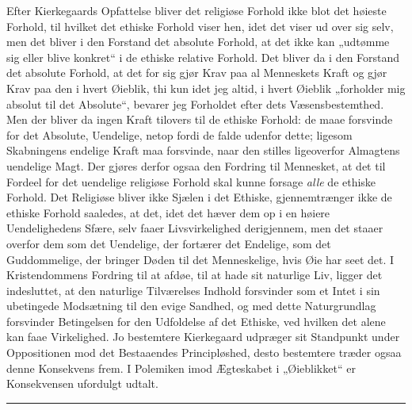 \documentclass[12pt,a4paper,openany]{book}
\newcommand{\opage}[1]{\marginnote{\footnotesize\textit{[#1]}}}
\begin{document}
Efter Kierkegaards Opfattelse bliver det religiøse Forhold
ikke blot det høieste Forhold, til hvilket det ethiske Forhold
viser hen, idet det viser ud over sig selv, men det bliver i
den Forstand det absolute Forhold, at det ikke kan „udtømme
sig eller blive konkret“ i de ethiske relative Forhold. Det
bliver da i den Forstand det absolute Forhold, at det for sig
gjør Krav paa al Menneskets Kraft og gjør Krav paa den
i hvert Øieblik, thi kun idet jeg altid, i hvert Øieblik „forholder
mig absolut til det Absolute“, bevarer jeg Forholdet
efter dets Væsensbestemthed. Men der bliver da ingen Kraft
tilovers til de ethiske Forhold: de maae forsvinde for det Absolute,
Uendelige, netop fordi de falde udenfor dette; ligesom
Skabningens endelige Kraft maa forsvinde, naar den stilles
ligeoverfor Almagtens uendelige Magt. Der gjøres derfor
ogsaa den Fordring til Mennesket, at det til Fordeel for det
uendelige religiøse Forhold skal kunne forsage \emph{alle} de ethiske
Forhold. Det Religiøse bliver ikke Sjælen i det Ethiske,
gjennemtrænger ikke de ethiske Forhold saaledes, at det, idet
det hæver dem op i en høiere Uendelighedens Sfære, selv faaer
Livsvirkelighed derigjennem, men det staaer overfor dem som
det Uendelige, der fortærer det Endelige, som det Guddommelige,
der bringer Døden til det Menneskelige, hvis Øie har seet det.
I Kristendommens Fordring til at afdøe, til at hade sit naturlige
Liv, ligger det indesluttet, at den naturlige Tilværelses
Indhold forsvinder som et Intet i sin ubetingede Modsætning
til den evige Sandhed, og med dette Naturgrundlag forsvinder
Betingelsen for den Udfoldelse af det Ethiske, ved
hvilken det alene kan faae Virkelighed. Jo bestemtere Kierkegaard
udpræger sit Standpunkt under Oppositionen mod det
\opage{438}Bestaaendes Principløshed, desto bestemtere træder ogsaa denne
Konsekvens frem. I Polemiken imod Ægteskabet i „Øieblikket“
er Konsekvensen ufordulgt udtalt.

\begin{center}\rule{1.8cm}{0.4pt}\end{center}
\end{document}
